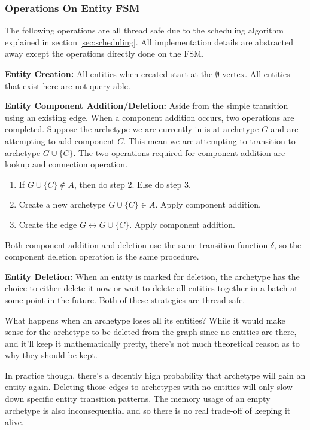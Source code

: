 \subsubsection{Operations On Entity FSM}
The following operations are all thread safe due to the scheduling algorithm explained in section \ref{sec:scheduling}. All implementation details are abstracted away except the operations directly done on the FSM. 

\textbf{Entity Creation:} All entities when created start at the $\emptyset$ vertex. All entities that exist here are not query-able.

\textbf{Entity Component Addition/Deletion:} Aside from the simple transition using an existing edge. When a component addition occurs, two operations are completed. Suppose the archetype we are currently in is at archetype $G$ and are attempting to add component $C$. This mean we are attempting to transition to archetype $G \cup \{C\}$. The two operations required for component addition are lookup and connection operation.

\begin{enumerate}
    \item If $G \cup \{C\} \not\in A$, then do step 2. Else do step 3.
    \item Create a new archetype $G \cup \{C\} \in A$. Apply component addition.
    \item Create the edge $G \leftrightarrow G \cup \{C\}$. Apply component addition.
\end{enumerate}

Both component addition and deletion use the same transition function $\delta$, so the component deletion operation is the same procedure.  

\textbf{Entity Deletion:} When an entity is marked for deletion, the archetype has the choice to either delete it now or wait to delete all entities together in a batch at some point in the future. Both of these strategies are thread safe. 

What happens when an archetype loses all its entities? While it would make sense for the archetype to be deleted from the graph since no entities are there, and it'll keep it mathematically pretty, there's not much theoretical reason as to why they should be kept. 

In practice though, there's a decently high probability that archetype will gain an entity again. Deleting those edges to archetypes with no entities will only slow down specific entity transition patterns. The memory usage of an empty archetype is also inconsequential and so there is no real trade-off of keeping it alive.

